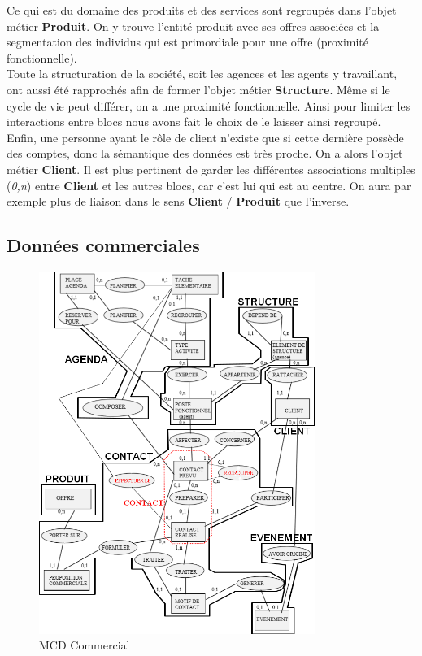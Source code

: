 Ce qui est du domaine des produits et des services sont regroupés dans l'objet métier \textbf{Produit}. On y trouve l'entité produit avec ses offres associées et la segmentation des individus qui est primordiale pour une offre (proximité fonctionnelle). \\

Toute la structuration de la société, soit les agences et les agents y travaillant, ont aussi été rapprochés afin de former l'objet métier \textbf{Structure}. Même si le cycle de vie peut différer, on a une proximité fonctionnelle. Ainsi pour limiter les interactions entre blocs nous avons fait le choix de le laisser ainsi regroupé. \\

Enfin, une personne ayant le rôle de client n'existe que si cette dernière possède des comptes, donc la sémantique des données est très proche. On a alors l'objet métier \textbf{Client}. Il est plus pertinent de garder les différentes associations multiples (\textit{0,n}) entre \textbf{Client} et les autres blocs, car c'est lui qui est au centre. On aura par exemple plus de liaison dans le sens \textbf{Client} / \textbf{Produit} que l'inverse.

\subsection{Données commerciales}

\begin{figure}[H]
\centering
\includegraphics[width=0.8\textwidth]{figures/mcd/MCD_Commercial}
\caption{MCD Commercial}
\end{figure}

